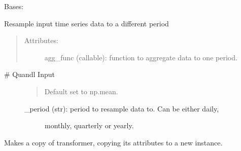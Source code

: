 \documentclass[letterpaper,10pt,english]{sphinxmanual}
\begin{document}
\begin{fulllineitems}
\label{\detokenize{dalio.pipe:dalio.pipe.Period}}
Bases: {\hyperref[\detokenize{beginners-guide:dalio.pipe.col_generation._ColGeneration}]{}}

Resample input time series data to a different period
\begin{quote}
\begin{description}
\item[{Attributes:}] \leavevmode
agg\_func (callable): function to aggregate data to one period.

\end{description}
\end{quote}
\begin{description}
\item[{\# Quandl Input}] \leavevmode\begin{quote}

Default set to np.mean.
\end{quote}
\begin{description}
\item[{\_period (str): period to resample data to. Can be either daily,}] \leavevmode
monthly, quarterly or yearly.

\end{description}

\end{description}

\begin{fulllineitems}
\label{\detokenize{dalio.pipe:dalio.pipe.Period.agg_func}}
\end{fulllineitems}


\begin{fulllineitems}
\label{\detokenize{dalio.pipe:dalio.pipe.Period.copy}}
Makes a copy of transformer, copying its attributes to a new
instance.


\end{fulllineitems}
\end{fulllineitems}
\end{document}
